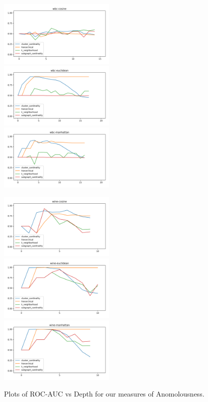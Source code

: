 \begin{figure}[!t]
\includegraphics[width=2.2in]{kdd/static/auc_vs_depth/wbc-cosine.png}
\includegraphics[width=2.2in]{kdd/static/auc_vs_depth/wbc-euclidean.png}
\includegraphics[width=2.2in]{kdd/static/auc_vs_depth/wbc-manhattan.png}

\includegraphics[width=2.2in]{kdd/static/auc_vs_depth/wine-cosine.png}
\includegraphics[width=2.2in]{kdd/static/auc_vs_depth/wine-euclidean.png}
\includegraphics[width=2.2in]{kdd/static/auc_vs_depth/wine-manhattan.png}

\caption{
Plots of ROC-AUC vs Depth for our measures of Anomolousness.
}

\label{results:datasets_3}
\end{figure}

